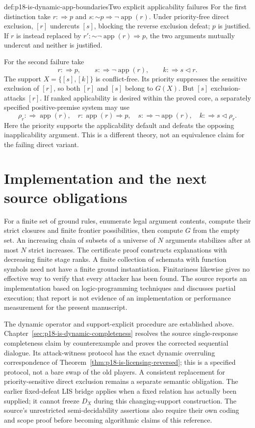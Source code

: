 \begin{hbexample}{def:p18-is-dynamic-app-boundaries}{Two explicit applicability failures}
For the first distinction take \(r:\Rightarrow p\) and
\(s:\mathord{\sim}p\Rightarrow\neg\operatorname{app}(r)\).
Under priority-free direct exclusion, \([r]\) undercuts \([s]\),
blocking the reverse exclusion defeat; \(p\) is justified.
If \(r\) is instead replaced by
\(r':\mathord{\sim}\neg\operatorname{app}(r)\Rightarrow p\),
the two arguments mutually undercut and neither is justified.

For the second failure take
\[
 r:\Rightarrow p,\qquad
 s:\Rightarrow\neg\operatorname{app}(r),\qquad
 k:\Rightarrow s\triangleleft r.
\]
The support \(X=\{[s],[k]\}\) is conflict-free. Its priority suppresses
the sensitive exclusion of \([r]\), so both \([r]\) and \([s]\)
belong to \(G(X)\). But \([s]\) exclusion-attacks \([r]\).
If ranked applicability is desired within the proved core, a
separately specified positive-premise system may use
\[
 \rho_r:\Rightarrow\operatorname{app}(r),\quad
 r:\operatorname{app}(r)\Rightarrow p,\quad
 s:\Rightarrow\neg\operatorname{app}(r),\quad
 k:\Rightarrow s\triangleleft\rho_r.
\]
Here the priority supports the applicability default and defeats
the opposing inapplicability argument. This is a different theory,
not an equivalence claim for the failing direct variant.
\end{hbexample}

\section{Implementation and the next source obligations}

For a finite set of ground rules, enumerate legal argument contents,
compute their strict closures and finite frontier possibilities,
then compute \(G\) from the empty set. An increasing chain of subsets
of a universe of \(N\) arguments stabilizes after at most \(N\)
strict increases. The certificate proof constructs explanations
with decreasing finite stage ranks. A finite collection of schemata
with function symbols need not have a finite ground instantiation.
Finitariness likewise gives no effective way to verify that every
attacker has been found. The source reports an implementation based
on logic-programming techniques and discusses partial execution;
that report is not evidence of an implementation or performance
measurement for the present manuscript.

The dynamic operator and support-explicit procedure are
established above. Chapter~\ref{sec:p18-is-dynamic-completeness}
resolves the source single-response completeness claim by
counterexample and proves the corrected sequential dialogue.
Its attack-witness protocol has the exact dynamic overruling
correspondence of Theorem~\ref{thm:p18-is-licensing-reversed};
this is a specified protocol, not a bare swap of the old players.
A consistent replacement for priority-sensitive direct exclusion
remains a separate semantic obligation.
The earlier fixed-defeat LIS bridge applies when a fixed relation
has actually been supplied; it cannot freeze \(D_X\) during this
changing-support construction.
The source's unrestricted semi-decidability assertions also require
their own coding and scope proof before becoming algorithmic claims
of this reference.
